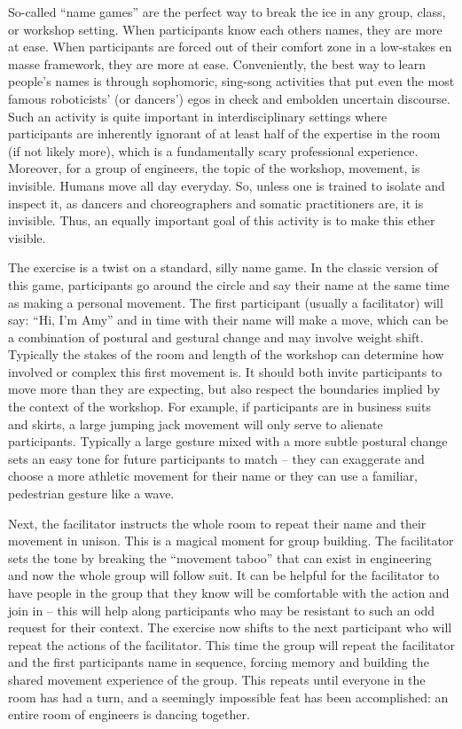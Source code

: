 \documentclass[arts,article,submit,moreauthors,pdftex,10pt,a4paper]{mdpi}
\begin{document}
So-called ``name games'' are the perfect way to break the ice in any group, class, or workshop setting.  When participants know each others names, they are more at ease.  When participants are forced out of their comfort zone in a low-stakes en masse framework, they are more at ease.  Conveniently, the best way to learn people's names is through sophomoric, sing-song activities that put even the most famous roboticists' (or dancers') egos in check and embolden uncertain discourse.  Such an activity is quite important in interdisciplinary settings where participants are inherently ignorant of at least half of the expertise in the room (if not likely more), which is a fundamentally scary professional experience.  
Moreover, for a group of engineers, the topic of the workshop, movement, is invisible.  Humans move all day everyday.  So, unless one is trained to isolate and inspect it, as dancers and choreographers and somatic practitioners are, it is invisible.  Thus, an equally important goal of this activity is to make this ether visible.

The exercise is a twist on a standard, silly name game.  In the classic version of this game, participants go around the circle and say their name at the same time as making a personal movement.  The first participant (usually a facilitator) will say:  ``Hi, I'm Amy'' and in time with their name will make a move, which can be a combination of postural and gestural change and may involve weight shift.  Typically the stakes of the room and length of the workshop can determine how involved or complex this first movement is.  It should both invite participants to move more than they are expecting, but also respect the boundaries implied by the context of the workshop.  For example, if participants are in business suits and skirts, a large jumping jack movement will only serve to alienate participants.  Typically a large gesture mixed with a more subtle postural change sets an easy tone for future participants to match -- they can exaggerate and choose a more athletic movement for their name or they can use a familiar, pedestrian gesture like a wave.

Next, the facilitator instructs the whole room to repeat their name and their movement in unison.  This is a magical moment for group building.  The facilitator sets the tone by breaking the ``movement taboo'' that can exist in engineering and now the whole group will follow suit.  It can be helpful for the facilitator to have people in the group that they know will be comfortable with the action and join in -- this will help along participants who may be resistant to such an odd request for their context.  The exercise now shifts to the next participant who will repeat the actions of the facilitator.  This time the group will repeat the facilitator and the first participants name in sequence, forcing memory and building the shared movement experience of the group.  This repeats until everyone in the room has had a turn, and a seemingly impossible feat has been accomplished: an entire room of engineers is dancing together.
\end{document}

